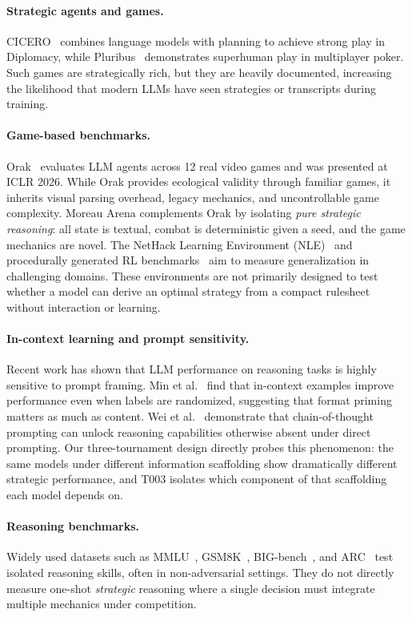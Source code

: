 \documentclass[11pt]{article}
\newcommand{\tThree}{T003}
\begin{document}
\paragraph{Strategic agents and games.}
CICERO~\cite{cicero} combines language models with planning to achieve strong play in Diplomacy, while Pluribus~\cite{pluribus} demonstrates superhuman play in multiplayer poker.
Such games are strategically rich, but they are heavily documented, increasing the likelihood that modern LLMs have seen strategies or transcripts during training.

\paragraph{Game-based benchmarks.}
Orak~\cite{orak} evaluates LLM agents across 12 real video games and was presented at ICLR 2026.
While Orak provides ecological validity through familiar games, it inherits visual parsing overhead, legacy mechanics, and uncontrollable game complexity.
Moreau Arena complements Orak by isolating \emph{pure strategic reasoning}: all state is textual, combat is deterministic given a seed, and the game mechanics are novel.
The NetHack Learning Environment (NLE)~\cite{nle} and procedurally generated RL benchmarks~\cite{procgen} aim to measure generalization in challenging domains.
These environments are not primarily designed to test whether a model can derive an optimal strategy from a compact rulesheet without interaction or learning.

\paragraph{In-context learning and prompt sensitivity.}
Recent work has shown that LLM performance on reasoning tasks is highly sensitive to prompt framing.
Min et al.~\cite{min2022} find that in-context examples improve performance even when labels are randomized, suggesting that format priming matters as much as content.
Wei et al.~\cite{wei2022} demonstrate that chain-of-thought prompting can unlock reasoning capabilities otherwise absent under direct prompting.
Our three-tournament design directly probes this phenomenon: the same models under different information scaffolding show dramatically different strategic performance, and \tThree{} isolates which component of that scaffolding each model depends on.

\paragraph{Reasoning benchmarks.}
Widely used datasets such as MMLU~\cite{mmlu}, GSM8K~\cite{gsm8k}, BIG-bench~\cite{bigbench}, and ARC~\cite{arc} test isolated reasoning skills, often in non-adversarial settings.
They do not directly measure one-shot \emph{strategic} reasoning where a single decision must integrate multiple mechanics under competition.
\end{document}
